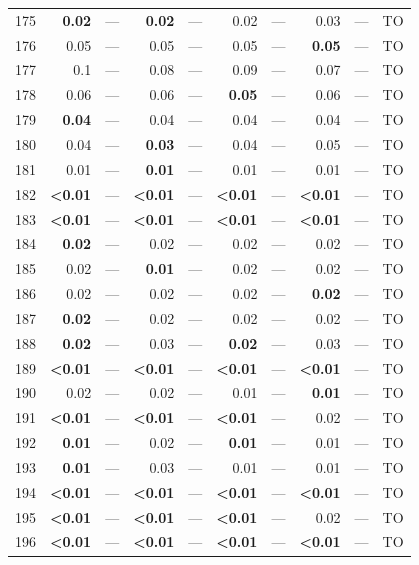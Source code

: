 \begin{longtable}{lr@{\hskip 4pt}l@{\hskip 12pt}r@{\hskip 4pt}l@{\hskip 12pt}r@{\hskip 4pt}l@{\hskip 12pt}r@{\hskip 4pt}l@{\hskip 12pt}r}
175 & \textbf{0.02} & --- & \textbf{0.02} & --- & 0.02 & --- & 0.03 & --- & TO \\
176 & 0.05 & --- & 0.05 & --- & 0.05 & --- & \textbf{0.05} & --- & TO \\
177 & 0.1 & --- & 0.08 & --- & 0.09 & --- & 0.07 & --- & TO \\
178 & 0.06 & --- & 0.06 & --- & \textbf{0.05} & --- & 0.06 & --- & TO \\
179 & \textbf{0.04} & --- & 0.04 & --- & 0.04 & --- & 0.04 & --- & TO \\
180 & 0.04 & --- & \textbf{0.03} & --- & 0.04 & --- & 0.05 & --- & TO \\
181 & 0.01 & --- & \textbf{0.01} & --- & 0.01 & --- & 0.01 & --- & TO \\
182 & \textbf{<0.01} & --- & \textbf{<0.01} & --- & \textbf{<0.01} & --- & \textbf{<0.01} & --- & TO \\
183 & \textbf{<0.01} & --- & \textbf{<0.01} & --- & \textbf{<0.01} & --- & \textbf{<0.01} & --- & TO \\
184 & \textbf{0.02} & --- & 0.02 & --- & 0.02 & --- & 0.02 & --- & TO \\
185 & 0.02 & --- & \textbf{0.01} & --- & 0.02 & --- & 0.02 & --- & TO \\
186 & 0.02 & --- & 0.02 & --- & 0.02 & --- & \textbf{0.02} & --- & TO \\
187 & \textbf{0.02} & --- & 0.02 & --- & 0.02 & --- & 0.02 & --- & TO \\
188 & \textbf{0.02} & --- & 0.03 & --- & \textbf{0.02} & --- & 0.03 & --- & TO \\
189 & \textbf{<0.01} & --- & \textbf{<0.01} & --- & \textbf{<0.01} & --- & \textbf{<0.01} & --- & TO \\
190 & 0.02 & --- & 0.02 & --- & 0.01 & --- & \textbf{0.01} & --- & TO \\
191 & \textbf{<0.01} & --- & \textbf{<0.01} & --- & \textbf{<0.01} & --- & 0.02 & --- & TO \\
192 & \textbf{0.01} & --- & 0.02 & --- & \textbf{0.01} & --- & 0.01 & --- & TO \\
193 & \textbf{0.01} & --- & 0.03 & --- & 0.01 & --- & 0.01 & --- & TO \\
194 & \textbf{<0.01} & --- & \textbf{<0.01} & --- & \textbf{<0.01} & --- & \textbf{<0.01} & --- & TO \\
195 & \textbf{<0.01} & --- & \textbf{<0.01} & --- & \textbf{<0.01} & --- & 0.02 & --- & TO \\
196 & \textbf{<0.01} & --- & \textbf{<0.01} & --- & \textbf{<0.01} & --- & \textbf{<0.01} & --- & TO \\

\end{longtable}
